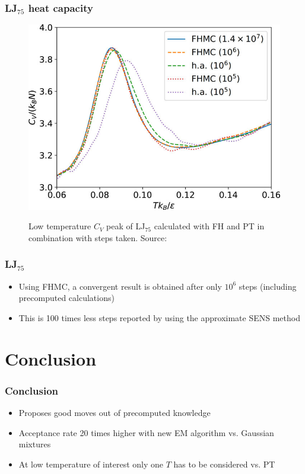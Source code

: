 \documentclass{beamer}
\begin{document}
 	\begin{frame}
 		\frametitle{LJ$_{75}$ heat capacity}
 		\begin{figure}
			\center
			\includegraphics[height=0.85\textheight]{figures/LJ75_Cv_low.jpg}
			\label{fig:LJ75_Cv_low}
			\caption{Low temperature $C_V$ peak of LJ$_{75}$ calculated with FH and PT in combination with steps taken. Source: \cite{Finkler2020}}
		\end{figure}
 	\end{frame}

 	\begin{frame}
 		\frametitle{LJ$_{75}$}
 		\begin{itemize}
 			\item Using FHMC, a convergent result is obtained after only $10^6$ steps (including precomputed calculations)
 			\item This is 100 times less steps reported by \citeauthor{Martiniani2014} \cite{Martiniani2014} using the approximate SENS method
		\end{itemize}
	\end{frame}

	\section{Conclusion}

	\begin{frame}
		\frametitle{Conclusion}
		\begin{itemize}
			\item Proposes good moves out of precomputed knowledge
			\item Acceptance rate 20 times higher with new EM algorithm vs. Gaussian mixtures
			\item At low temperature of interest only one $T$ has to be considered vs. PT
		\end{itemize}
	\end{frame}
\end{document}
